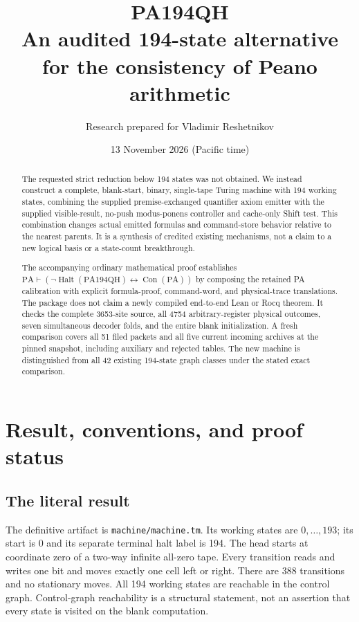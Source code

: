 \documentclass[11pt,letterpaper]{article}
\title{PA194QH\\An audited 194-state alternative\\for the consistency of Peano arithmetic}
\author{Research prepared for Vladimir Reshetnikov}
\date{13 November 2026 (Pacific time)}
\newcommand{\PA}{\mathrm{PA}}
\newcommand{\Con}{\operatorname{Con}}
\newcommand{\Halt}{\operatorname{Halt}}
\newcommand{\file}[1]{\texttt{\nolinkurl{#1}}}
\newcommand{\candidate}{\mathrm{PA194QH}}
\begin{document}
\maketitle
\begin{abstract}
The requested strict reduction below 194 states was not obtained. We instead
construct a complete, blank-start, binary, single-tape Turing machine with
194 working states, combining the supplied premise-exchanged quantifier
axiom emitter with the supplied visible-result, no-push modus-ponens
controller and cache-only Shift test. This combination changes actual
emitted formulas and command-store behavior relative to the nearest
parents. It is a synthesis of credited existing mechanisms, not a claim to
a new logical basis or a state-count breakthrough.

The accompanying ordinary mathematical proof establishes
$\PA\vdash(\neg\Halt(\candidate)\leftrightarrow\Con(\PA))$
by composing the retained PA calibration with explicit formula-proof,
command-word, and physical-trace translations. The package does not claim
a newly compiled end-to-end Lean or Rocq theorem. It checks the complete
3653-site source, all 4754 arbitrary-register physical outcomes, seven
simultaneous decoder folds, and the entire blank initialization. A fresh
comparison covers all 51 filed packets and all five current incoming
archives at the pinned snapshot, including auxiliary and rejected tables.
The new machine is distinguished from all 42 existing 194-state graph
classes under the stated exact comparison.
\end{abstract}
\clearpage
\tableofcontents
\newpage

\section{Result, conventions, and proof status}
\label{sec:result}

\subsection{The literal result}
The definitive artifact is \file{machine/machine.tm}. Its working states
are $0,\ldots,193$; its start is 0 and its separate terminal halt label is
194. The head starts at coordinate zero of a two-way infinite all-zero
tape. Every transition reads and writes one bit and moves exactly one cell
left or right. There are 388 transitions and no stationary moves.
All 194 working states are reachable in the control graph. Control-graph
reachability is a structural statement, not an assertion that every state
is visited on the blank computation.
\end{document}
